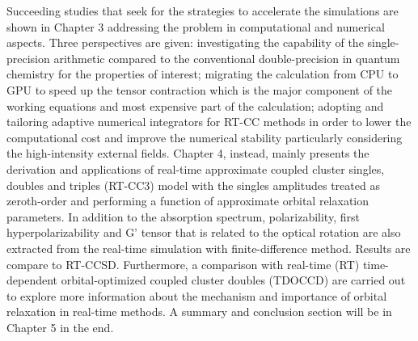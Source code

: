 Succeeding studies that seek for the strategies to accelerate the simulations are shown in Chapter 3 addressing the problem in computational and numerical aspects. Three perspectives are given: investigating the capability of the single-precision arithmetic compared to the conventional double-precision in quantum chemistry for the properties of interest; migrating the calculation from CPU to GPU to speed up the tensor contraction which is the major component of the working equations and most expensive part of the calculation; adopting and tailoring adaptive numerical integrators for RT-CC methods in order to lower the computational cost and improve the numerical stability particularly considering the high-intensity external fields. Chapter 4, instead, mainly presents the derivation and applications of real-time approximate coupled cluster singles, doubles and triples (RT-CC3) model with the singles amplitudes treated as zeroth-order and performing a function of  approximate orbital relaxation parameters. In addition to the absorption spectrum, polarizability, first hyperpolarizability and G’ tensor that is related to the optical rotation are also extracted from the real-time simulation with finite-difference method.\cite{Ding2013} Results are compare to RT-CCSD. Furthermore, a comparison with real-time (RT) time-dependent orbital-optimized coupled cluster doubles (TDOCCD)\cite{Krylov2000, Kristiansen2022} are carried out to explore more information about the mechanism and importance of orbital relaxation in real-time methods. A summary and conclusion section will be in Chapter 5 in the end. 